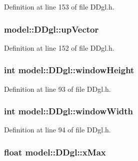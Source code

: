Definition at line 153 of file D\+Dgl.\+h.

\hypertarget{structmodel_1_1_d_dgl_a60a4f11d333d8a955538ddd66cb19880}{}
\subsubsection[{up\+Vector}]{ model\+::\+D\+Dgl\+::up\+Vector}\label{structmodel_1_1_d_dgl_a60a4f11d333d8a955538ddd66cb19880}


Definition at line 152 of file D\+Dgl.\+h.

\hypertarget{structmodel_1_1_d_dgl_a5c03c6cee2fb5224cefb3aa890256897}{}
\subsubsection[{window\+Height}]{\setlength{\rightskip}{0pt plus 5cm}int model\+::\+D\+Dgl\+::window\+Height}\label{structmodel_1_1_d_dgl_a5c03c6cee2fb5224cefb3aa890256897}


Definition at line 93 of file D\+Dgl.\+h.

\hypertarget{structmodel_1_1_d_dgl_a8bb0d0d2d58b2065f85b830fa8c5822a}{}
\subsubsection[{window\+Width}]{\setlength{\rightskip}{0pt plus 5cm}int model\+::\+D\+Dgl\+::window\+Width}\label{structmodel_1_1_d_dgl_a8bb0d0d2d58b2065f85b830fa8c5822a}


Definition at line 94 of file D\+Dgl.\+h.

\hypertarget{structmodel_1_1_d_dgl_aa9ea5a5aafc2775c8022a29f787ea41a}{}
\subsubsection[{x\+Max}]{\setlength{\rightskip}{0pt plus 5cm}float model\+::\+D\+Dgl\+::x\+Max}\label{structmodel_1_1_d_dgl_aa9ea5a5aafc2775c8022a29f787ea41a}


